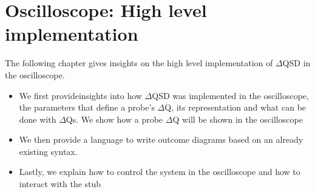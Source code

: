 \chapter{Oscilloscope: High level implementation}
    The following chapter gives insights on the high level implementation of $\Delta$QSD in the oscilloscope.
    \begin{itemize}
        \item We first provideinsights into how $\Delta$QSD was implemented in the oscilloscope, the parameters that define a probe's $\Delta$Q, its representation and what can be done with $\Delta$Qs. We show how a probe $\Delta$Q will be shown in the oscilloscope
        \item We then provide a language to write outcome diagrams based on an already existing syntax.
        \item Lastly, we explain how to control the system in the oscilloscope and how to interact with the stub
    \end{itemize}





%

